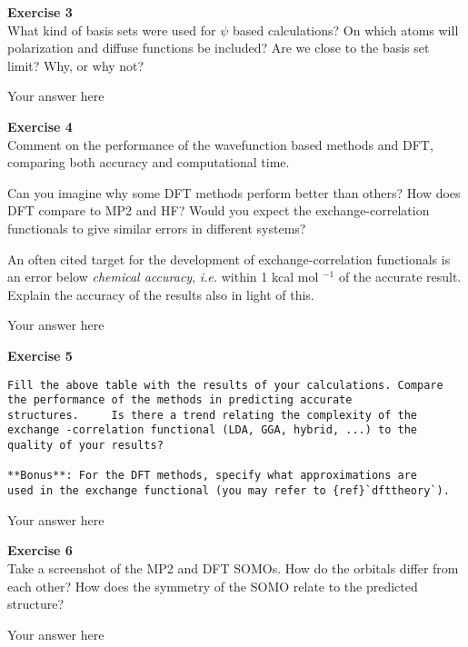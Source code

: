 \documentclass{article}
\begin{document}
\begin{mdframed}
\textbf{Exercise 3}\\
What kind of basis sets were used for $\psi$ based calculations? On which atoms will polarization and diffuse functions be included? Are we close to the basis set limit? Why, or why not?
\end{mdframed}

Your answer here

\begin{mdframed}
\textbf{Exercise 4}\\
Comment on the performance of the wavefunction based methods and DFT, comparing both accuracy and computational time.

Can you imagine why some DFT methods perform better than others? How does DFT compare to MP2 and HF?
Would you expect the exchange-correlation functionals to give similar errors in different systems?

An often cited target for the development of exchange-correlation functionals is an error below \textit{chemical accuracy}, \textit{i.e.} within 1
kcal mol $^{ -1}$ of the accurate result. Explain the accuracy of the results also in light of this.
\end{mdframed}

Your answer here

\begin{mdframed}
\textbf{Exercise 5}\\
\begin{verbatim}
Fill the above table with the results of your calculations. Compare the performance of the methods in predicting accurate
structures.     Is there a trend relating the complexity of the exchange -correlation functional (LDA, GGA, hybrid, ...) to the quality of your results?

**Bonus**: For the DFT methods, specify what approximations are
used in the exchange functional (you may refer to {ref}`dfttheory`).
\end{verbatim}
\end{mdframed}

Your answer here

\begin{mdframed}
\textbf{Exercise 6}\\
Take a screenshot of the MP2 and DFT SOMOs. How do the orbitals differ from each other? How does the symmetry of the SOMO relate to the predicted structure?
\end{mdframed}

Your answer here
\end{document}
